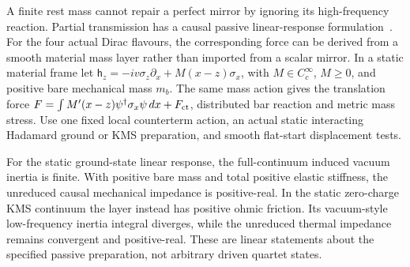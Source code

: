 A finite rest mass cannot repair a perfect mirror by ignoring its
high-frequency reaction. Partial transmission has a causal passive
linear-response formulation~\cite{JaekelReynaud1992}. For the four
actual Dirac flavours, the corresponding force can be derived from a
smooth material mass layer rather than imported from a scalar mirror.
In a static material frame let
$\mathsf h_z=-iv\sigma_z\partial_x+M(x-z)\sigma_x$, with
$M\in C_c^\infty$, $M\ge0$, and positive bare mechanical mass $m_b$.
The same mass action gives the translation force
$F=\int M'(x-z)\psi^\dagger\sigma_x\psi\,dx+F_{\rm ct}$,
distributed bar reaction and metric mass stress. Use one fixed local
counterterm action, an actual static interacting Hadamard ground or
KMS preparation, and smooth flat-start displacement tests.

\begin{proposition}
\label{prop:Dirac-wall-passivity}
For the static ground-state linear response, the full-continuum induced
vacuum inertia is finite. With positive bare mass and total positive
elastic stiffness, the unreduced causal mechanical impedance is
positive-real. In the static zero-charge KMS continuum the layer instead
has positive ohmic friction. Its vacuum-style low-frequency inertia
integral diverges, while the unreduced thermal impedance remains
convergent and positive-real. These are linear statements about the
specified passive preparation, not arbitrary driven quartet states.
\end{proposition}

